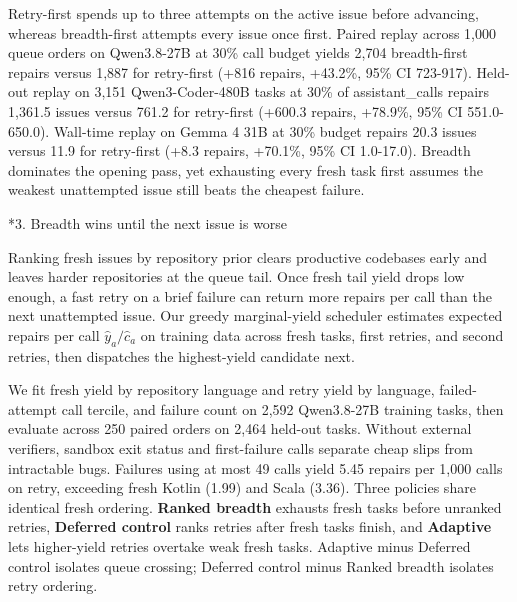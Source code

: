 \documentclass[10pt,a4paper]{article}
\makeatletter
\renewcommand{\section}{\@startsection{section}{1}{\z@}{-1.6ex plus -.2ex minus -.2ex}{.65ex}{\large\bfseries\raggedright}}
\makeatother
\begin{document}
Retry-first spends up to three attempts on the active issue before advancing, whereas breadth-first attempts every issue once first. Paired replay across 1,000 queue orders on Qwen3.8-27B at 30\% call budget yields 2,704 breadth-first repairs versus 1,887 for retry-first (+816 repairs, +43.2\%, 95\% CI 723-917). Held-out replay on 3,151 Qwen3-Coder-480B tasks at 30\% of assistant\_\allowbreak{}calls repairs 1,361.5 issues versus 761.2 for retry-first (+600.3 repairs, +78.9\%, 95\% CI 551.0-650.0). Wall-time replay on Gemma 4 31B at 30\% budget repairs 20.3 issues versus 11.9 for retry-first (+8.3 repairs, +70.1\%, 95\% CI 1.0-17.0). Breadth dominates the opening pass, yet exhausting every fresh task first assumes the weakest unattempted issue still beats the cheapest failure.

\section*{3. Breadth wins until the next issue is worse}

Ranking fresh issues by repository prior clears productive codebases early and leaves harder repositories at the queue tail. Once fresh tail yield drops low enough, a fast retry on a brief failure can return more repairs per call than the next unattempted issue. Our greedy marginal-yield scheduler estimates expected repairs per call \(\hat{y}_a / \hat{c}_a\) on training data across fresh tasks, first retries, and second retries, then dispatches the highest-yield candidate next.

We fit fresh yield by repository language and retry yield by language, failed-attempt call tercile, and failure count on 2,592 Qwen3.8-27B training tasks, then evaluate across 250 paired orders on 2,464 held-out tasks. Without external verifiers, sandbox exit status and first-failure calls separate cheap slips from intractable bugs. Failures using at most 49 calls yield 5.45 repairs per 1,000 calls on retry, exceeding fresh Kotlin (1.99) and Scala (3.36). Three policies share identical fresh ordering. \textbf{Ranked breadth} exhausts fresh tasks before unranked retries, \textbf{Deferred control} ranks retries after fresh tasks finish, and \textbf{Adaptive} lets higher-yield retries overtake weak fresh tasks. Adaptive minus Deferred control isolates queue crossing; Deferred control minus Ranked breadth isolates retry ordering.
\end{document}
